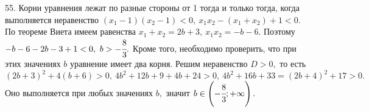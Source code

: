 55. Корни уравнения лежат по разные стороны от 1 тогда и только тогда, когда выполняется неравенство $(x_1-1)(x_2-1)<0,\ x_1x_2-(x_1+x_2)+1<0.$ По теореме Виета имеем равенства $x_1+x_2=2b+3,\ x_1x_2=-b-6.$ Поэтому $-b-6-2b-3+1<0,\
b>-\cfrac{8}{3}.$ Кроме того, необходимо проверить, что при этих значениях $b$ уравнение имеет два корня. Решим неравенство $D>0,$ то есть $(2b+3)^2+4(b+6)>0,\
4b^2+12b+9+4b+24>0,\ 4b^2+16b+33=(2b+4)^2+17>0.$ Оно выполняется при любых значениях $b,$ значит $b\in\left(-\cfrac{8}{3};+\infty\right).$\\
